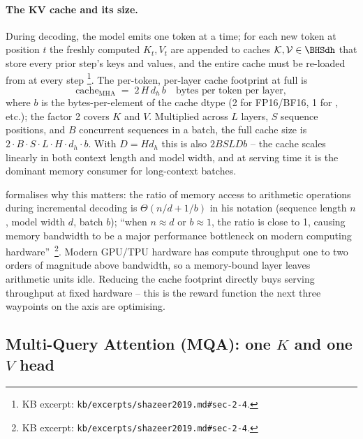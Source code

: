 \paragraph{The KV cache and its size.} During 
decoding, the model emits one token at a time; for each new token at
position $t$ the freshly computed $K_t, V_t$ are appended to caches
$\mathcal{K}, \mathcal{V} \in \BHSdh$ that store every prior step's
keys and values, and the entire cache must be re-loaded from  at
every step \citep[\S 1, \S 2.4]{shazeer2019}%
\footnote{KB excerpt: \nolinkurl{kb/excerpts/shazeer2019.md#sec-2-4}.}.
The per-token, per-layer cache footprint at full  is
\begin{equation}
  \mathrm{cache}_{\mathrm{MHA}} \;=\;
  2\,H\,d_h\,b
  \quad\text{bytes per token per layer},
  \label{eq:mha-cache}
\end{equation}
where $b$ is the bytes-per-element of the cache dtype (2 for FP16/BF16,
1 for , etc.); the factor 2 covers $K$ and $V$. Multiplied across
$L$ layers, $S$ sequence positions, and $B$ concurrent sequences in a
batch, the full cache size is $2 \cdot B \cdot S \cdot L \cdot H
\cdot d_h \cdot b$. With $D = H d_h$ this is also $2 B S L D b$ -- the
cache scales linearly in both context length and model width, and at
serving time it is the dominant memory consumer for long-context
batches.

\citet{shazeer2019} formalises why this matters: the ratio of memory
access to arithmetic operations during incremental decoding is
$\Theta(n/d + 1/b)$ in his notation (sequence length $n$, model width
$d$, batch $b$); ``when $n \approx d$ or $b \approx 1$, the ratio is
close to 1, causing memory bandwidth to be a major performance
bottleneck on modern computing hardware''~\citep[\S
2.4]{shazeer2019}\footnote{KB excerpt:
\nolinkurl{kb/excerpts/shazeer2019.md#sec-2-4}.}. Modern GPU/TPU
hardware has compute throughput one to two orders of magnitude above
 bandwidth, so a memory-bound layer leaves arithmetic units
idle. Reducing the cache footprint directly buys serving throughput
at fixed hardware -- this is the reward function the next three
waypoints on the axis are optimising.

\subsection{Multi-Query Attention (MQA): one $K$ and one $V$ head}
\label{sec:attn-mqa}

